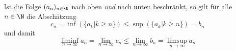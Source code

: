 Ist die Folge $(a_n)_{n \in \N}$ nach oben \textit{und} nach unten beschränkt, so gilt für alle $n \in \N$ die Abschätzung
$$c_n = \inf(\{a_k | k \geq n\}) \leq \sup(\{a_k | k \geq n\}) = b_n$$
und damit 
$$\liminf_{n \to \infty} a_n = \lim_{n \to \infty} c_n \leq \lim_{n \to \infty} b_n = \limsup_{n \to \infty} a_n$$